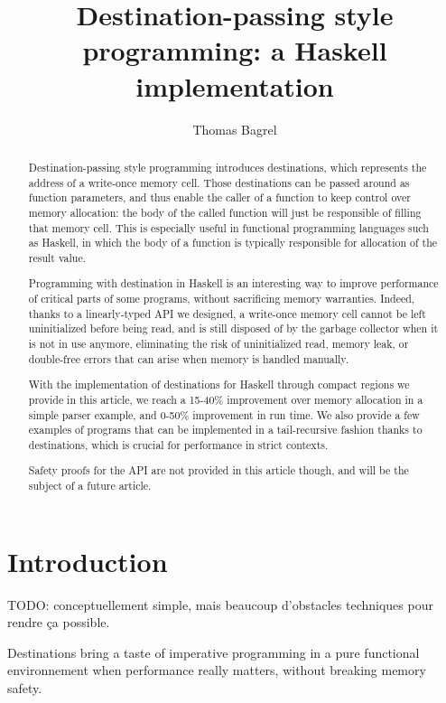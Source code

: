 \documentclass[english]{jflart}
\title{Destination-passing style programming: a Haskell implementation}
\author[1]{Thomas Bagrel}
\affil[1]{INRIA/LORIA, Vand\oe{}uvre-lès-Nancy, 54500, France}
\affil[2]{TWEAG, Paris, 75012, France}
\begin{document}
\maketitle

\begin{abstract}
Destination-passing style programming introduces destinations, which represents the address of a write-once memory cell. Those destinations can be passed around as function parameters, and thus enable the caller of a function to keep control over memory allocation: the body of the called function will just be responsible of filling that memory cell. This is especially useful in functional programming languages such as Haskell, in which the body of a function is typically responsible for allocation of the result value.

Programming with destination in Haskell is an interesting way to improve performance of critical parts of some programs, without sacrificing memory warranties. Indeed, thanks to a linearly-typed API we designed, a write-once memory cell cannot be left uninitialized before being read, and is still disposed of by the garbage collector when it is not in use anymore, eliminating the risk of uninitialized read, memory leak, or double-free errors that can arise when memory is handled manually.

With the implementation of destinations for Haskell through compact regions we provide in this article, we reach a 15-40\% improvement over memory allocation in a simple parser example, and 0-50\% improvement in run time. We also provide a few examples of programs that can be implemented in a tail-recursive fashion thanks to destinations, which is crucial for performance in strict contexts.

Safety proofs for the API are not provided in this article though, and will be the subject of a future article.
\end{abstract}

\tableofcontents{}

\section{Introduction}

TODO: conceptuellement simple, mais beaucoup d'obstacles techniques pour rendre ça possible.

 Destinations bring a taste of imperative programming in a pure functional environnement when performance really matters, without breaking memory safety.
\end{document}
